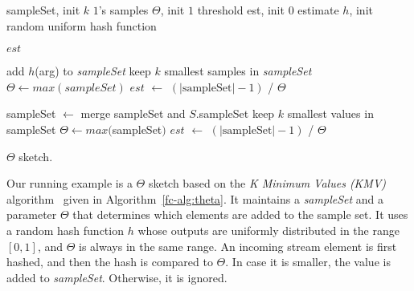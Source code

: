 \begin{algorithm}[htb]
    \small
    \begin{algorithmic}[1]
        \Vars
        \State   sampleSet, init $k$ $1$'s \Comment samples
        \State  $\Theta$, init $1$			\Comment threshold
         est, init $0$ \Comment estimate
        \State $h$, init random uniform hash function 
        \EndFor
        
        \State \Return $est$ \label{fc-l:query}
        \EndProcedure
        
         \Return
        \EndIf
        \State add $h$(arg) to \emph{sampleSet}
        \State keep $k$ smallest samples in \emph{sampleSet}
        \State $\Theta \leftarrow max(sampleSet)$
        \State $\mathit{est}$ $\leftarrow $ $\left( |\text{sampleSet}|-1 \right)$ / $\Theta$
        \EndProcedure

        \State sampleSet $\leftarrow$ merge sampleSet and $S$.sampleSet
        \State keep $k$ smallest values in sampleSet
        \State $\Theta \leftarrow max($sampleSet$)$
        \State $\mathit{est}$ $\leftarrow $ $\left( |\text{sampleSet}|-1 \right)$ / $\Theta$ \label{fc-l:update-est}
        \EndProcedure
        
    \end{algorithmic}
    \caption{$\Theta$ sketch.}
    \label{fc-alg:theta}
\end{algorithm}

Our running example is a $\Theta$ sketch based on the 
\emph{K Minimum Values (KMV)} algorithm~\cite{KMV} given in Algorithm~\ref{fc-alg:theta}. It maintains a \emph{sampleSet} and a parameter $\Theta$
that determines which elements are added to the sample set. 
It uses a random hash function $h$ whose outputs are uniformly distributed
in the range $[0,1]$, and $\Theta$ is always in the same range.  
An incoming stream element is first hashed, and then the hash is compared to $\Theta$. 
In case it is smaller, the value is added to \emph{sampleSet}.  Otherwise, it is ignored. 

